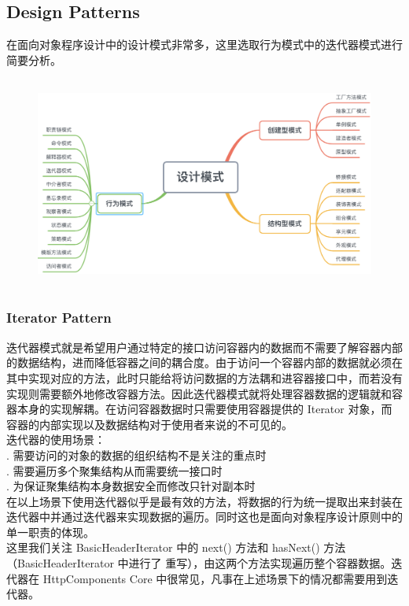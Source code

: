 \documentclass{article}
\begin{document}
	\clearpage
	\subsection{Design Patterns}
	\begin{CJK}{UTF8}{gbsn}
		\indent \indent 在面向对象程序设计中的设计模式非常多，这里选取行为模式中的迭代器模式进行简要分析。
	\end{CJK}{}
	\begin{figure}[H]
		\centering
		\includegraphics[height = 7cm, width = 13.5cm]{pics/35_Design_Patterns.png}	
	\end{figure}
	\subsubsection{Iterator Pattern}
	\begin{CJK}{UTF8}{gbsn}
		\indent \indent 迭代器模式就是希望用户通过特定的接口访问容器内的数据而不需要了解容器内部的数据结构，进而降低容器之间的耦合度。由于访问一个容器内部的数据就必须在其中实现对应的方法，此时只能给将访问数据的方法耦和进容器接口中，而若没有实现则需要额外地修改容器方法。因此迭代器模式就将处理容器数据的逻辑就和容器本身的实现解耦。在访问容器数据时只需要使用容器提供的 Iterator 对象，而容器的内部实现以及数据结构对于使用者来说的不可见的。\\
		\indent 迭代器的使用场景：\\
		\indent {}. 需要访问的对象的数据的组织结构不是关注的重点时\\
		\indent {}. 需要遍历多个聚集结构从而需要统一接口时\\
		\indent {}. 为保证聚集结构本身数据安全而修改只针对副本时\\
		\indent 在以上场景下使用迭代器似乎是最有效的方法，将数据的行为统一提取出来封装在迭代器中并通过迭代器来实现数据的遍历。同时这也是面向对象程序设计原则中的单一职责的体现。\\
		\indent 这里我们关注 BasicHeaderIterator 中的 next() 方法和 hasNext() 方法（BasicHeaderIterator 中进行了 重写），由这两个方法实现遍历整个容器数据。迭代器在 HttpComponents Core 中很常见，凡事在上述场景下的情况都需要用到迭代器。
	\end{CJK}{}
\end{document}
